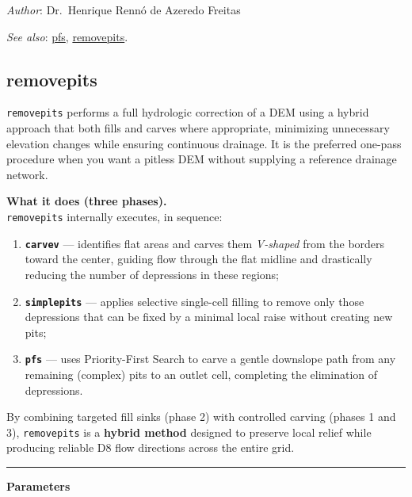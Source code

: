 \documentclass[
]{book}
\providecommand{\tightlist}{%
  \setlength{\itemsep}{0pt}\setlength{\parskip}{0pt}}
\begin{document}
\emph{Author}: Dr.~Henrique Rennó de Azeredo Freitas

\emph{See also}: \hyperref[pfs]{pfs}, \hyperref[removepits]{removepits}.

\subsection{removepits}\label{removepits}

\texttt{removepits} performs a full hydrologic correction of a DEM using a hybrid approach that both fills and carves where appropriate, minimizing unnecessary elevation changes while ensuring continuous drainage. It is the preferred one-pass procedure when you want a pitless DEM without supplying a reference drainage network.

\textbf{What it does (three phases).}\\
\texttt{removepits} internally executes, in sequence:

\begin{enumerate}
\def\labelenumi{\arabic{enumi})}
\tightlist
\item
  \textbf{\texttt{carvev}} --- identifies flat areas and carves them \emph{V-shaped} from the borders toward the center, guiding flow through the flat midline and drastically reducing the number of depressions in these regions;\\
\item
  \textbf{\texttt{simplepits}} --- applies selective single-cell filling to remove only those depressions that can be fixed by a minimal local raise without creating new pits;\\
\item
  \textbf{\texttt{pfs}} --- uses Priority-First Search to carve a gentle downslope path from any remaining (complex) pits to an outlet cell, completing the elimination of depressions.
\end{enumerate}

By combining targeted fill sinks (phase 2) with controlled carving (phases 1 and 3), \texttt{removepits} is a \textbf{hybrid method} designed to preserve local relief while producing reliable D8 flow directions across the entire grid.

\begin{center}\rule{0.5\linewidth}{0.5pt}\end{center}

\textbf{Parameters}
\end{document}
